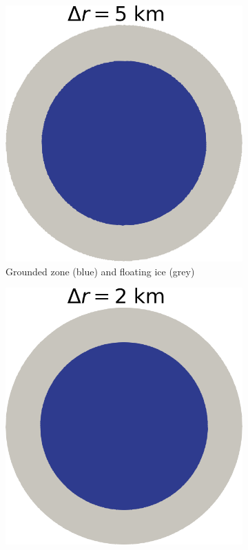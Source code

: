 \documentclass{article}
\begin{document}
\begin{figure}[!h]
	\medskip
	\begin{subfigure}{0.25\textwidth}
		\includegraphics[width=\linewidth]{../fig/Grounded_zone_5km_CONE.png}
		\caption{Grounded zone (blue) and floating ice (grey)}
		\label{figCONE5}
	\end{subfigure}\hfil %
	\begin{subfigure}{0.25\textwidth}
		\includegraphics[width=\linewidth]{../fig/Grounded_zone_2km_CONE.png}

\end{subfigure}
\end{figure}
\end{document}
